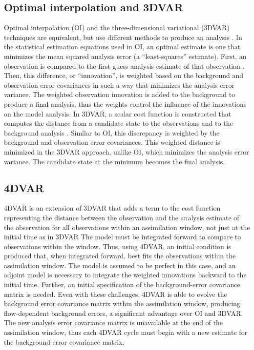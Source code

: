 \subsection{Optimal interpolation and 3DVAR}
Optimal interpolation (OI) and the three-dimensional variational (3DVAR) techniques are equivalent, but use different methods to produce an analysis \citep{lorenc86}. In the statistical estimation equations used in OI, an optimal estimate is one that minimizes the mean squared analysis error (a “least-squares” estimate). First, an observation is compared to the first-guess analysis estimate of that observation \citep{gandin63}. Then, this difference, or “innovation”, is weighted based on the background and observation error covariances in such a way that minimizes the analysis error variance. The weighted observation innovation is added to the background to produce a final analysis, thus the weights control the influence of the innovations on the model analysis. In 3DVAR, a scalar cost function is constructed that computes the distance from a candidate state to the observations and to the background analysis \citep{sasaki70}. Similar to OI, this discrepancy is weighted by the background and observation error covariances. This weighted distance is minimized in the 3DVAR approach, unlike OI, which minimizes the analysis error variance. The candidate state at the minimum becomes the final analysis.

\subsection{4DVAR}
4DVAR is an extension of 3DVAR that adds a term to the cost function representing the distance between the observation and the analysis estimate of the observation for all observations within an assimilation window, not just at the initial time as in 3DVAR \citep{talagrandcourtier87} The model must be integrated forward to compare to observations within the window. Thus, using 4DVAR, an initial condition is produced that, when integrated forward, best fits the observations within the assimilation window. The model is assumed to be perfect in this case, and an adjoint model is necessary to integrate the weighted innovations backward to the initial time. Further, an initial specification of the background-error covariance matrix is needed. Even with these challenges, 4DVAR is able to evolve the background error covariance matrix within the assimilation window, producing flow-dependent background errors, a significant advantage over OI and 3DVAR. The new analysis error covariance matrix is unavailable at the end of the assimilation window, thus each 4DVAR cycle must begin with a new estimate for the background-error covariance matrix.

